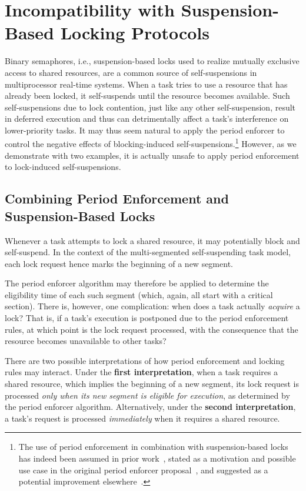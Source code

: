 \section{Incompatibility with Suspension-Based Locking Protocols}
\label{sec:locking}

Binary semaphores, i.e., suspension-based locks used to realize mutually exclusive access to shared resources, are a common source of self-suspensions in multiprocessor real-time systems. When a task tries to use a resource that has already been locked, it self-suspends until the resource becomes available. Such self-suspensions due to lock contention, just like any other self-suspension, result in deferred execution and thus can detrimentally affect a task's interference on lower-priority tasks. It may thus seem natural to apply the period enforcer  to control the negative effects of blocking-induced self-suspensions.\footnote{The use of  period enforcement in combination with suspension-based locks has indeed been assumed in prior work~\cite{Raj:91}, stated as a motivation and possible use case in the original period enforcer proposal~\cite{Raj:suspension1991}, and suggested as a potential improvement elsewhere~\cite{Lak:11,LNR:09}.} However, as we demonstrate with two examples, it is actually unsafe to apply period enforcement to lock-induced self-suspensions. 



\subsection{Combining Period Enforcement and Suspension-Based Locks}

Whenever a task attempts to lock a shared resource, it may potentially block and self-suspend. In the context of the multi-segmented self-suspending task model, each lock request hence marks the beginning of a new segment.

The period enforcer algorithm may therefore be applied to determine the eligibility time of each such segment (which, again, all start with a critical section). There is, however, one complication: when does a task actually \emph{acquire} a lock? That is, if a task's execution is postponed due to the period enforcement rules, at which point is the lock request processed, with the consequence that the resource becomes unavailable to other tasks? 

There are two possible interpretations of how period enforcement and locking rules may interact. Under the \textbf{first interpretation}, when a task requires a shared resource, which implies the beginning of a new segment, its lock request is processed \emph{only when its new segment is eligible for execution}, as determined by the period enforcer algorithm. Alternatively, under the \textbf{second interpretation}, a task's request is processed \emph{immediately} when it requires a shared resource.

